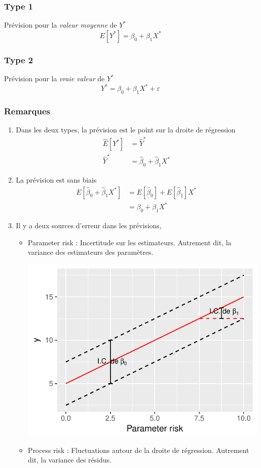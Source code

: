 \documentclass[11pt,french]{report}
\begin{document}
\subsubsection*{Type 1}
Prévision pour la \emph{valeur moyenne} de $Y^*$
$$
E[Y^*] = \beta_0 + \beta_1X^*
$$

\subsubsection*{Type 2}
Prévision pour la \emph{vraie valeur} de $Y^*$
$$
Y^* = \beta_0 + \beta_1X^* + \varepsilon
$$

\subsubsection*{Remarques}
\begin{enumerate}
\item Dans les deux types, la prévision est le point sur la droite de régression
\begin{align*}
\widehat{E}[Y^*] &= \hat{Y}^* \\
\hat{Y}^* &= \hat{\beta}_0 +  \hat{\beta}_1X^*
\end{align*}
\item La prévision est sans biais 
\begin{align*}
E[\hat{\beta}_0 +  \hat{\beta}_1X^*] &= E[\hat{\beta}_0] + E[\hat{\beta}_1]X^* \\
&= \beta_0 +  \beta_1X^*
\end{align*}
\item Il y a deux sources d'erreur dans les prévisions,
\begin{itemize}
\item Parameter risk : Incertitude sur les estimateurs. Autrement dit, la variance des estimateurs des paramètres.

\includegraphics{notes_de_cours-018}
\item Process risk : Fluctuations autour de la droite de régression. Autrement dit, la variance des résidus.


\end{itemize}
\end{enumerate}
\end{document}
